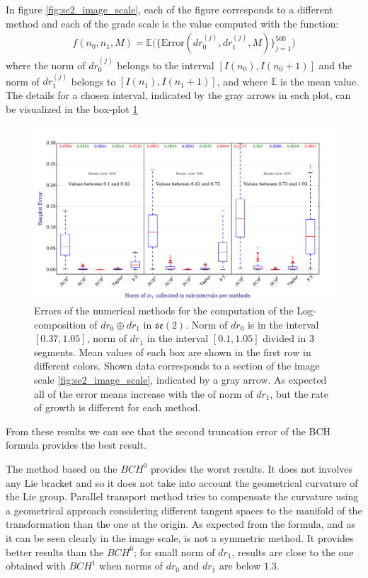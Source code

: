In figure \ref{fig:se2_image_scale}, each of the figure corresponds to a different method and each of the grade scale is the value computed with the function:
\begin{align*}
f(n_0,n_1,M) 
=
 \mathbb{E}\Big(
  \{ 
  \text{Error}(dr_{0}^{(j)},dr_{1}^{(j)}, M) 
  \}_{j=1}^{500}
  \Big)
\end{align*}
where the norm of $dr_{0}^{(j)}$ belongs to the interval $[I(n_0), I(n_0+1)]$ and the norm of 
$dr_{1}^{(j)}$ belongs to $[I(n_1), I(n_1+1)]$, and where $\mathbb{E}$ is the mean value.\\
The details for a chosen interval, indicated by the gray arrows in each plot, can be visualized in the box-plot \ref{fig:se2_boxplot}
%
\begin{figure}[!ht]
	\hspace{-1cm}
	\includegraphics[scale=0.51]{figures/se2_boxplot.pdf}
	\caption{Errors of the numerical methods for the computation of the Log-composition of $dr_{0} \oplus dr_{1}$ in $\mathfrak{se}(2)$. Norm of $dr_{0}$ is in the interval $[0.37,1.05]$, norm of $dr_{1}$ in the interval $[0.1, 1.05]$ divided in 3 segments. Mean values of each box are shown in the first row in different colors. Shown data corresponds to a section of the image scale \ref{fig:se2_image_scale}, indicated by a gray arrow. As expected all of the error means increase with the of norm of $dr_1$, but the rate of growth is different for each method.}
	\label{fig:se2_boxplot}
\end{figure}
%

From these results we can see that the second truncation error of the BCH formula provides the best result.

The method based on the $BCH^0$ provides the worst results. It does not involves any Lie bracket and so it does not take into account the geometrical curvature of the Lie group. Parallel transport method tries to compensate the curvature using a geometrical approach considering different tangent spaces to the manifold of the transformation than the one at the origin. As expected from the formula, and as it can be seen clearly in the image scale, is not a symmetric method. It provides better results than the $BCH^0$; for small norm of $dr_1$, results are close to the one obtained with $BCH^1$ when norms of $dr_0$ and $dr_1$ are below $1.3$.

